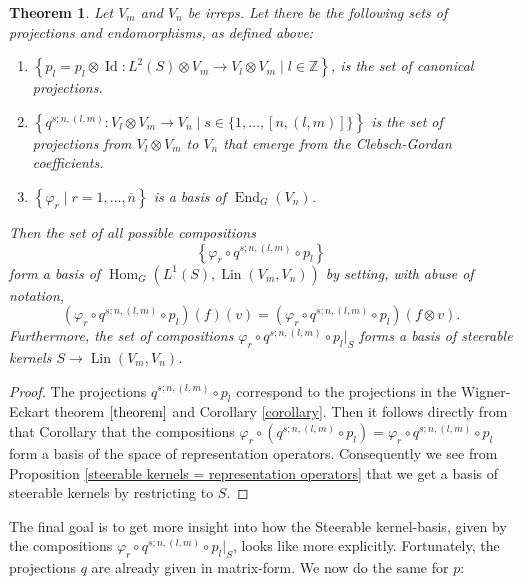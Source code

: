 \documentclass[12pt, a4paper]{article}
\theoremstyle{plain}
\newtheorem{thm}[pro]{Theorem}
\theoremstyle{definition}
\theoremstyle{remark}
\newcommand{\Z}{\mathds{Z}}
\DeclareMathOperator{\lin}{Lin}
\DeclareMathOperator{\End}{End}
\DeclareMathOperator{\Hom}{Hom}
\DeclareMathOperator{\Id}{Id}
\begin{document}
\begin{thm}\label{representation operators basis}
Let $V_m$ and $V_n$ be irreps. Let there be the following sets of projections and endomorphisms, as defined above:
\begin{enumerate}
\item $\left\lbrace p_l = p_l \otimes \Id: L^2(S) \otimes V_m \to V_l \otimes V_m \mid l \in \Z \right\rbrace$, is the set of canonical projections.
\item $\left\lbrace q^{s;n,(l,m)}: V_l \otimes V_m \to V_n \mid s \in \{1, \dots, [n,(l,m)]\} \right\rbrace$ is the set of projections from $V_l \otimes V_m$ to $V_n$ that emerge from the Clebsch-Gordan coefficients.
\item $\left\lbrace \varphi_r \mid r = 1, \dots, \overline{n} \right\rbrace$ is a basis of $\End_G(V_n)$.
\end{enumerate}
Then the set of all possible compositions 
\begin{equation*}
\left\lbrace \varphi_r \circ q^{s;n,(l,m)} \circ p_l \right\rbrace
\end{equation*} 
form a basis of $\Hom_G(L^1(S), \lin(V_m, V_n))$ by setting, with abuse of notation, 
\begin{equation*}
(\varphi_r \circ q^{s;n,(l,m)} \circ p_l)(f)(v) = (\varphi_r \circ q^{s;n,(l,m)} \circ p_l)(f \otimes v).
\end{equation*}
Furthermore, the set of compositions $\varphi_r \circ q^{s;n,(l,m)} \circ p_l|_{S}$ forms a basis of steerable kernels $S \to \lin(V_m, V_n)$.
\end{thm}

\begin{proof}
The projections $q^{s;n,(l,m)} \circ p_l$ correspond to the projections in the Wigner-Eckart theorem $\ref{theorem}$ and Corollary \ref{corollary}. Then it follows directly from that Corollary that the compositions $\varphi_r \circ (q^{s;n,(l,m)} \circ p_l) = \varphi_r \circ q^{s;n,(l,m)} \circ p_l$ form a basis of the space of representation operators. Consequently we see from Proposition \ref{steerable kernels = representation operators} that we get a basis of steerable kernels by restricting to $S$.
\end{proof}

The final goal is to get more insight into how the Steerable kernel-basis, given by the compositions $\varphi_r \circ q^{s;n,(l,m)} \circ p_l|_S$, looks like more explicitly. Fortunately, the projections $q$ are already given in matrix-form. We now do the same for $p$:
\end{document}
